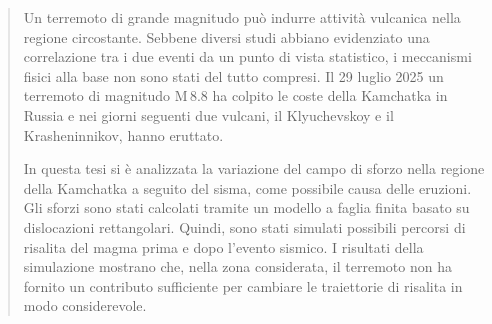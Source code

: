 \renewcommand{\abstractname}{Sommario}

\begin{abstract}
   Un terremoto di grande magnitudo può indurre attività vulcanica nella regione circostante.
   Sebbene diversi studi abbiano evidenziato una correlazione tra i due eventi da un punto di vista statistico, i meccanismi fisici alla base non sono stati del tutto compresi.
   Il 29 luglio 2025 un terremoto di magnitudo \(\mathrm{M}\,8.8\) ha colpito le coste della Kamchatka in Russia e nei giorni seguenti due vulcani, il Klyuchevskoy e il Krasheninnikov, hanno eruttato.
   
   In questa tesi si è analizzata la variazione del campo di sforzo nella regione della Kamchatka a seguito del sisma, come possibile causa delle eruzioni.
   Gli sforzi sono stati calcolati tramite un modello a faglia finita basato su dislocazioni rettangolari. Quindi, sono stati simulati possibili percorsi di risalita del magma prima e dopo l'evento sismico. I risultati della simulazione mostrano che, nella zona considerata, il terremoto non ha fornito un contributo sufficiente per cambiare le traiettorie di risalita in modo considerevole.
\end{abstract}
